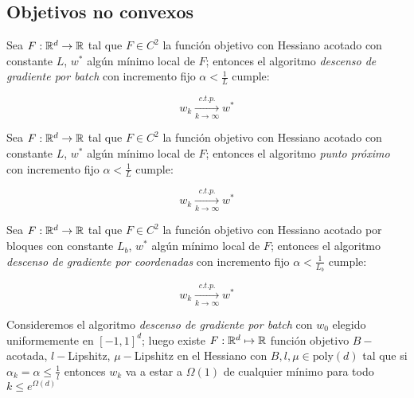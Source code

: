 \subsection{Objetivos no convexos}

\begin{theorem}
	Sea $F: {\mathbb{R}}^d \rightarrow {\mathbb{R}}$ tal que $F \in C^2$ la funci\'on objetivo con Hessiano acotado con constante $L$, $w^*$ alg\'un m\'inimo local de $F$; entonces el algoritmo \textit{descenso de gradiente por batch} con incremento fijo $\alpha < \frac{1}{L}$ cumple:
	
	\begin{equation*}
		w_k \xrightarrow[k \rightarrow \infty]{c.t.p.} w^*
	\end{equation*}
	
\end{theorem}

\begin{theorem}
	Sea $F: {\mathbb{R}}^d \rightarrow {\mathbb{R}}$ tal que $F \in C^2$ la funci\'on objetivo con Hessiano acotado con constante $L$, $w^*$ alg\'un m\'inimo local de $F$; entonces el algoritmo \textit{punto pr\'oximo } con incremento fijo $\alpha < \frac{1}{L}$ cumple:
	
	\begin{equation*}
	w_k \xrightarrow[k \rightarrow \infty]{c.t.p.} w^*
	\end{equation*}
	
\end{theorem}

\begin{theorem}
	Sea $F: {\mathbb{R}}^d \rightarrow {\mathbb{R}}$ tal que $F \in C^2$  la funci\'on objetivo con Hessiano acotado por bloques con constante $L_b$, $w^*$ alg\'un m\'inimo local de $F$; entonces el algoritmo \textit{descenso de gradiente por coordenadas} con incremento fijo $\alpha < \frac{1}{L_b}$ cumple:
	
\begin{equation*}
w_k \xrightarrow[k \rightarrow \infty]{c.t.p.} w^*
\end{equation*}
	
\end{theorem}

\begin{theorem}
	Consideremos el algoritmo \textit{descenso de gradiente por batch} con $w_0$ elegido uniformemente en $[-1,1]^d$; luego existe $F : {\mathbb{R}}^d \mapsto {\mathbb{R}}$ funci\'on objetivo $B-$acotada, $l-$Lipshitz, $\mu-$Lipshitz en el Hessiano con $B,l,\mu \in \text{poly}(d)$ tal que si $\alpha_k = \alpha \leq \frac{1}{l}$ entonces $w_k$ va a estar a $\Omega(1)$ de cualquier m\'inimo para todo $k \leq e^{\Omega(d)}$
\end{theorem}

